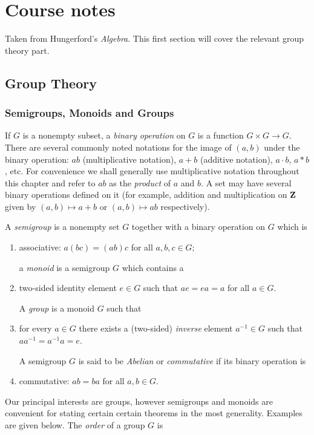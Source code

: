 \chapter{Course notes}
Taken from Hungerford's \emph{Algebra}. This first section will cover the
relevant group theory part.
\section{Group Theory}
\subsection{Semigroups, Monoids and Groups}
If $G$ is a nonempty subset, a \emph{binary operation} on $G$ is a function
$G\times G\to G$. There are several commonly noted notations for the image
of $(a,b)$ under the binary operation: $ab$ (multiplicative notation),
$a+b$ (additive notation), $a\cdot b$, $a*b$, etc. For convenience we shall
generally use multiplicative notation throughout this chapter and refer to
$ab$ as the \emph{product} of $a$ and $b$. A set may have several binary
operations defined on it (for example, addition and multiplication on
$\mathbf{Z}$ given by $(a,b)\mapsto a+b$ or $(a,b)\mapsto ab$ respectively).
\begin{definition}
A \emph{semigroup} is a nonempty set $G$ together with a binary operation
on $G$ which is
\begin{enumerate}[label=\textnormal{(\alph*)}]
\item associative: $a(bc)=(ab)c$ for all $a,b,c\in G$;

  \bigskip
  a \emph{monoid}  is a semigroup $G$ which contains a
\item two-sided identity element $e\in G$ such that $ae=ea=a$ for all $a\in
  G$.

  \bigskip
  A \emph{group} is a monoid $G$ such that
\item for every $a\in G$ there exists a (two-sided) \emph{inverse} element
  $a^{-1}\in G$ such that $aa^{-1}=a^{-1}a=e$.

  \bigskip
  A semigroup $G$ is said to be \emph{Abelian} or \emph{commutative} if its
  binary operation is
\item commutative: $ab=ba$ for all $a,b\in G$.
\end{enumerate}
\end{definition}
Our principal interests are groups, however semigroups and monoids are
convenient for stating certain certain theorems in the most
generality. Examples are given below. The \emph{order} of a group $G$ is
